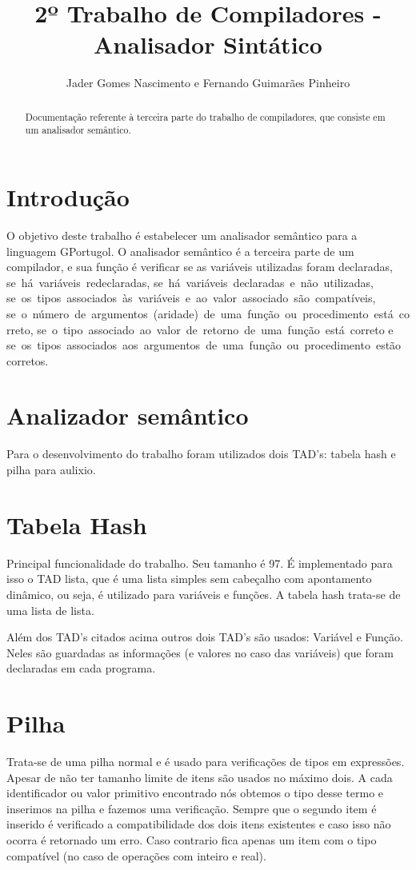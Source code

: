 \documentclass[a4paper,10pt]{article}
\title{2º Trabalho de Compiladores - Analisador Sintático}
\author{Jader Gomes Nascimento e Fernando Guimarães Pinheiro}
\begin{document}
\maketitle

\begin{abstract}
Documentação referente à terceira parte do trabalho de compiladores, que consiste em um analisador semântico.
\end{abstract}

\section{Introdução}
O objetivo deste trabalho é estabelecer um analisador semântico para a linguagem GPortugol. O analisador semântico é a terceira parte de um compilador, e sua função é verificar se as variáveis utilizadas foram declaradas, se há variáveis redeclaradas, se há variáveis declaradas e não utilizadas, se os tipos associados às variáveis e ao valor associado são compatíveis, se o número de argumentos (aridade) de uma função ou procedimento está correto, se o tipo associado ao valor de retorno de uma função está correto e se os tipos associados aos argumentos de uma função ou procedimento estão corretos.


\section{Analizador semântico}
Para o desenvolvimento do trabalho foram utilizados dois TAD's: tabela hash e pilha para aulixio.

\section{Tabela Hash}
Principal funcionalidade do trabalho. Seu tamanho é 97. É implementado para isso o TAD lista, que é uma lista simples sem cabeçalho com apontamento dinâmico, ou seja, é utilizado para variáveis e funções.
A tabela hash trata-se de uma lista de lista.

Além dos TAD's citados acima outros dois TAD's são usados: Variável e Função. Neles são guardadas as informações (e valores no caso das variáveis) que foram declaradas em cada programa.

\section{Pilha}
Trata-se de uma pilha normal e é usado para verificações de tipos em expressões.
Apesar de não ter tamanho limite de itens são usados no máximo dois. A cada identificador ou valor primitivo encontrado nós obtemos o tipo desse termo e inserimos na pilha e fazemos uma verificação. Sempre que o segundo item é inserido é verificado a compatibilidade dos dois itens existentes e caso isso não ocorra é retornado um erro. Caso contrario fica apenas um item com o tipo compatível (no caso de operações com inteiro e real).
\end{document}
